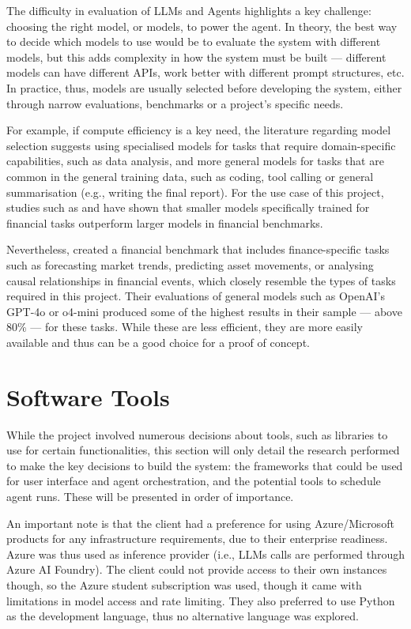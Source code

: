 \documentclass[a4paper]{report}
\begin{document}
The difficulty in evaluation of LLMs and Agents highlights a key challenge: choosing the right model, or models, to power the agent. In theory, the best way to decide which models to use would be to evaluate the system with different models, but this adds complexity in how the system must be built --- different models can have different APIs, work better with different prompt structures, etc. In practice, thus, models are usually selected before developing the system, either through narrow evaluations, benchmarks or a project's specific needs.

For example, if compute efficiency is a key need, the literature regarding model selection suggests using specialised models for tasks that require domain-specific capabilities, such as data analysis, and more general models for tasks that are common in the general training data, such as coding, tool calling or general summarisation (e.g., writing the final report). For the use case of this project, studies such as \cite{ke2025demystifyingdomainadaptiveposttrainingfinancial} and \cite{tanabe2024enhancingfinancialdomainadaptation} have shown that smaller models specifically trained for financial tasks outperform larger models in financial benchmarks.

Nevertheless, \cite{lu2025bizfinbench} created a financial benchmark that includes finance-specific tasks such as forecasting market trends, predicting asset movements, or analysing causal relationships in financial events, which closely resemble the types of tasks required in this project. Their evaluations of general models such as OpenAI's GPT-4o or o4-mini produced some of the highest results in their sample --- above 80\% --- for these tasks. While these are less efficient, they are more easily available and thus can be a good choice for a proof of concept.

\section{Software Tools}
\label{sec:research-tools}

While the project involved numerous decisions about tools, such as libraries to use for certain functionalities, this section will only detail the research performed to make the key decisions to build the system: the frameworks that could be used for user interface and agent orchestration, and the potential tools to schedule agent runs. These will be presented in order of importance.

An important note is that the client had a preference for using Azure/Microsoft products for any infrastructure requirements, due to their enterprise readiness. Azure was thus used as inference provider (i.e., LLMs calls are performed through Azure AI Foundry). The client could not provide access to their own instances though, so the Azure student subscription was used, though it came with limitations in model access and rate limiting. They also preferred to use Python as the development language, thus no alternative language was explored.
\end{document}
